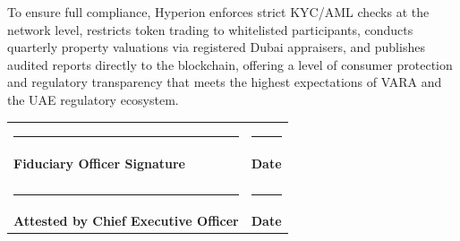 \documentclass[11pt]{article}
\begin{document}
To ensure full compliance, Hyperion enforces strict KYC/AML checks at the network level, restricts token trading to whitelisted participants, conducts quarterly property valuations via registered Dubai appraisers, and publishes audited reports directly to the blockchain, offering a level of consumer protection and regulatory transparency that meets the highest expectations of VARA and the UAE regulatory ecosystem.

\par\vspace{1.5cm}
\noindent
\begin{tabularx}{\textwidth}{X X}
    \rule{4cm}{0.4pt} & \rule{4cm}{0.4pt} \\
    \textbf{Fiduciary Officer Signature} & \textbf{Date} \\
    & \\
    \rule{4cm}{0.4pt} & \rule{4cm}{0.4pt} \\
    \textbf{Attested by Chief Executive Officer} & \textbf{Date}
\end{tabularx}

\makehyperionseal
\end{document}
